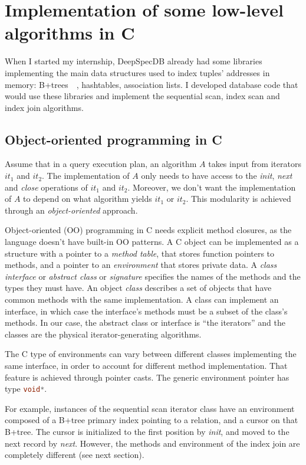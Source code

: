 \documentclass[11pt]{article}
\def\ce{\lstinline[language=C, breaklines=true, columns=fixed]}
\begin{document}
\section{Implementation of some low-level algorithms in C}
\label{implementation}
When I started my internship, DeepSpecDB already had some libraries implementing the main data structures used to index tuples' addresses in memory:
B+trees~\cite{Tosin}~\cite{Aurele}, hashtables, association lists.
I developed database code that would use these libraries and implement the sequential scan, index scan and index join algorithms. 

\subsection{Object-oriented programming in C}

Assume that in a query execution plan, an algorithm $A$ takes input from iterators $\textit{it}_1$ and $\textit{it}_2$.
The implementation of $A$ only needs to have access to the \emph{init}, \emph{next} and \emph{close} operations of $\textit{it}_1$ and $\textit{it}_2$.
Moreover, we don't want the implementation of $A$ to depend on what algorithm yields $\textit{it}_1$ or $\textit{it}_2$.
This modularity is achieved through an \emph{object-oriented} approach.

Object-oriented (OO) programming in C needs explicit method closures, as the language doesn't have built-in OO patterns.
A C object can be implemented as a structure with a pointer to a \emph{method table}, that stores function pointers to methods,
and a pointer to an \emph{environment} that stores private data.
A \emph{class interface} or \emph{abstract class} or \emph{signature} specifies the names of the methods and the types they must have.
An object \emph{class} describes a set of objects that have common methods with the same implementation.
A class can implement an interface, in which case the interface's methods must be a subset of the class's methods.
In our case, the abstract class or interface is ``the iterators'' and the classes are the physical iterator-generating algorithms.

The C type of environments can vary between different classes implementing the same interface,
in order to account for different method implementation.
That feature is achieved through pointer casts. The generic environment pointer has type \ce{void*}.

For example, instances of the sequential scan iterator class have an environment composed of a B+tree primary index pointing to a relation, and a cursor on that B+tree.
The cursor is initialized to the first position by \emph{init}, and moved to the next record by \emph{next}.
However, the methods and environment of the index join are completely different (see next section).
\end{document}
